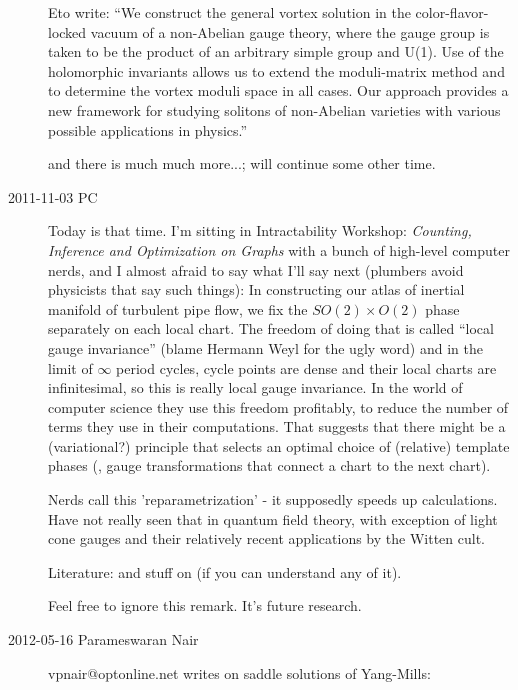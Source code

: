 \begin{description}
Eto \etal{} write:
   ``We construct the general vortex solution in the color-flavor-locked
   vacuum of a non-Abelian gauge theory, where the gauge group is taken
   to be the product of an arbitrary simple group and U(1). Use of the
   holomorphic invariants allows us to extend the moduli-matrix method
   and to determine the vortex moduli space in all cases. Our approach
   provides a new framework for studying solitons of non-Abelian
   varieties with various possible applications in physics.''

and there is much much more...; will continue some other time.

\item[2011-11-03 PC] Today is that time. I'm sitting in
     {Intractability Workshop:}
     \emph{Counting, Inference and Optimization on Graphs}
with a bunch of high-level computer nerds, and I almost afraid to say
what I'll say next (plumbers avoid physicists that say such things): In
constructing our atlas of inertial manifold of turbulent pipe flow, we
fix the $SO(2) \times O(2)$ phase separately on each local chart. The
freedom of doing that is called ``local gauge invariance'' (blame Hermann
Weyl for the ugly word) and in the limit of $\infty$ period cycles, cycle
points are dense and their local charts are infinitesimal, so this is
really local gauge invariance. In the world of computer science they use
this freedom profitably, to reduce the number of terms they use in their
computations. That suggests that there might be a (variational?)
principle that selects an optimal choice of (relative) template phases
(\ie, gauge transformations that connect a chart to the next chart).

Nerds call this 'reparametrization' - it supposedly speeds up calculations.
Have not really seen that in quantum field theory, with exception of light
cone gauges and their relatively recent applications by the Witten cult.

Literature:  and stuff on
 (if you can understand any of it).

Feel free to ignore this remark. It's future research.

\item[2012-05-16  Parameswaran Nair]  vpnair@optonline.net writes
on saddle solutions of Yang-Mills:


\end{description}
